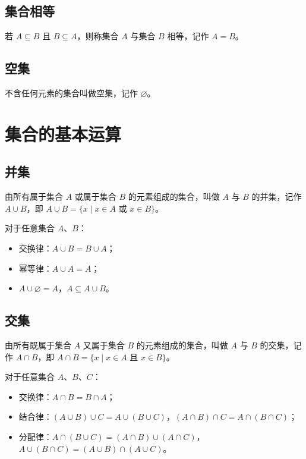 \documentclass[lang=cn,newtx,10pt,scheme=chinese,nofont]{elegantbook}
\begin{document}
\subsection{集合相等}
\begin{definition}[集合相等]
若 $A \subseteq B$ 且 $B \subseteq A$，则称集合 $A$ 与集合 $B$ 相等，记作 $A = B$。
\end{definition}
\subsection{空集}
\begin{definition}[空集]
不含任何元素的集合叫做空集，记作 $\varnothing$。
\end{definition}

\section{集合的基本运算}
\subsection{并集}
\begin{definition}[并集]
由所有属于集合 $A$ 或属于集合 $B$ 的元素组成的集合，叫做 $A$ 与 $B$ 的并集，记作 $A \cup B$，即 $A \cup B = \{x \mid x \in A \text{ 或 } x \in B\}$。
\end{definition}
\begin{lemma}[并集的性质]
对于任意集合 $A$、$B$：
\begin{itemize}
    \item 交换律：$A \cup B=B \cup A$；
    \item 幂等律：$A \cup A=A$；
    \item $A \cup \varnothing=A$，$A \subseteq A \cup B$。
\end{itemize}
\end{lemma}
\subsection{交集}
\begin{definition}[交集]
由所有既属于集合 $A$ 又属于集合 $B$ 的元素组成的集合，叫做 $A$ 与 $B$ 的交集，记作 $A \cap B$，即 $A \cap B = \{x \mid x \in A \text{ 且 } x \in B\}$。
\end{definition}
\begin{theorem}[并集与交集的运算律]
对于任意集合 $A$、$B$、$C$：
\begin{itemize}
    \item 交换律：$A \cap B=B \cap A$；
    \item 结合律：$(A \cup B) \cup C=A \cup (B \cup C)$，$(A \cap B) \cap C=A \cap (B \cap C)$；
    \item 分配律：$A \cap (B \cup C)=(A \cap B) \cup (A \cap C)$，$A \cup (B \cap C)=(A \cup B) \cap (A \cup C)$。
\end{itemize}
\end{theorem}
\end{document}
